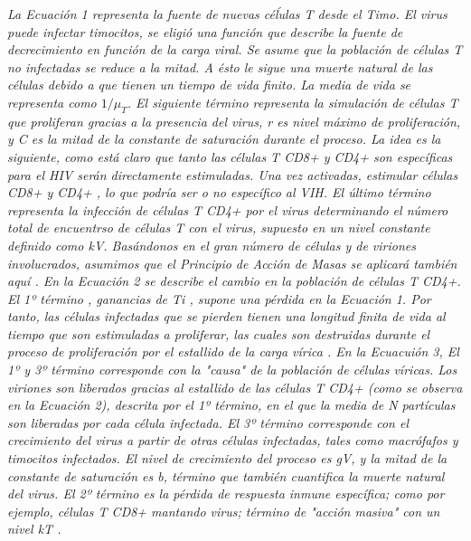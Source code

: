 \documentclass[a4paper,twocolumn,10pt]{article}
\begin{document}
\itshape La Ecuación 1 representa la fuente de nuevas céĺulas T desde el Timo.  El virus puede infectar timocitos, se eligió una función que describe la fuente de decrecimiento en función de la carga viral. Se asume que la población de células T no infectadas se reduce a la mitad. A ésto le sigue una muerte natural de las células debido a que tienen un tiempo de vida finito. La media de vida se representa como $1/\mu_T$. El siguiente término representa la simulación de células T que proliferan gracias a la presencia del virus, r es nivel máximo de proliferación, y C es la mitad  de la constante de saturación durante el proceso. La idea es la siguiente, como está claro que tanto las células T CD8+ y CD4+ son específicas para el HIV serán directamente estimuladas. Una vez activadas, estimular células CD8+ y CD4+ , lo que podría ser o no específico al VIH. El último término representa la infección de células T CD4+ por el virus determinando el número total de encuentrso de células T con el virus, supuesto en un nivel constante definido como kV. 
Basándonos en el gran número de células y de viriones involucrados, asumimos que el Principio de Acción de Masas se aplicará también aquí \cite{Kirschner1996}.\newline \newline
En la Ecuación 2 se describe el cambio en la población de células T CD4+. El 1º término , ganancias de Ti , supone una pérdida en la Ecuación 1. Por tanto, las células infectadas que se pierden tienen una longitud finita de vida al tiempo  que son estimuladas a proliferar, las cuales son destruidas durante el proceso de proliferación por el estallido de la carga vírica \cite{Kirschner1996}. \newline \newline
En la Ecuacuión 3, El 1º y 3º término corresponde con la "causa" de la población de células víricas. Los viriones son liberados gracias al estallido de las células T CD4+ (como se observa en la Ecuación 2), descrita por el 1º término, en el que la media de N partículas son liberadas por cada célula infectada. El 3º término corresponde con el crecimiento del virus a partir de otras células infectadas, tales como macrófafos y timocitos infectados. El nivel de crecimiento del proceso es gV, y la mitad de la constante de saturación es b, término que también cuantifica la muerte natural del virus. El 2º término es la pérdida de respuesta inmune específica; como por ejemplo, células T CD8+ mantando virus; término de "acción masiva" con un nivel kT \cite{Kirschner1996}.
\end{document}
